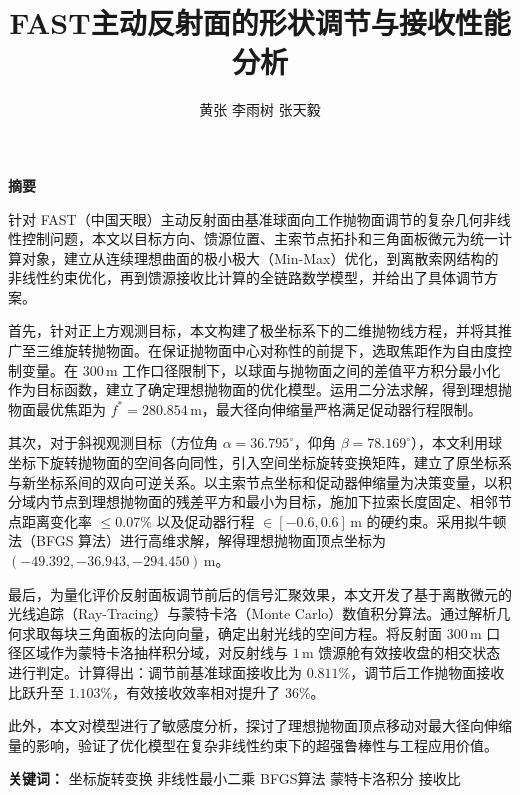 \documentclass[UTF8,a4paper,zihao=-4]{ctexart}
\title{\heiti FAST主动反射面的形状调节与接收性能分析}
\author{黄张 \quad 李雨树 \quad 张天毅}
\date{}
\begin{document}
\maketitle
\thispagestyle{empty}

\begin{center}
    {\bfseries 摘要}
\end{center}

针对 FAST（中国天眼）主动反射面由基准球面向工作抛物面调节的复杂几何非线性控制问题，本文以目标方向、馈源位置、主索节点拓扑和三角面板微元为统一计算对象，建立从连续理想曲面的极小极大（Min-Max）优化，到离散索网结构的非线性约束优化，再到馈源接收比计算的全链路数学模型，并给出了具体调节方案。

首先，针对正上方观测目标，本文构建了极坐标系下的二维抛物线方程，并将其推广至三维旋转抛物面。在保证抛物面中心对称性的前提下，选取焦距作为自由度控制变量。在 $300\,\mathrm{m}$ 工作口径限制下，以球面与抛物面之间的差值平方积分最小化作为目标函数，建立了确定理想抛物面的优化模型。运用二分法求解，得到理想抛物面最优焦距为 $f^*=280.854\,\mathrm{m}$，最大径向伸缩量严格满足促动器行程限制。

其次，对于斜视观测目标（方位角 $\alpha=36.795^\circ$，仰角 $\beta=78.169^\circ$），本文利用球坐标下旋转抛物面的空间各向同性，引入空间坐标旋转变换矩阵，建立了原坐标系与新坐标系间的双向可逆关系。以主索节点坐标和促动器伸缩量为决策变量，以积分域内节点到理想抛物面的残差平方和最小为目标，施加下拉索长度固定、相邻节点距离变化率 $\le 0.07\%$ 以及促动器行程 $\in [-0.6, 0.6]\,\mathrm{m}$ 的硬约束。采用拟牛顿法（BFGS 算法）进行高维求解，解得理想抛物面顶点坐标为 $(-49.392, -36.943, -294.450)\,\mathrm{m}$。

最后，为量化评价反射面板调节前后的信号汇聚效果，本文开发了基于离散微元的光线追踪（Ray-Tracing）与蒙特卡洛（Monte Carlo）数值积分算法。通过解析几何求取每块三角面板的法向向量，确定出射光线的空间方程。将反射面 $300\,\mathrm{m}$ 口径区域作为蒙特卡洛抽样积分域，对反射线与 $1\,\mathrm{m}$ 馈源舱有效接收盘的相交状态进行判定。计算得出：调节前基准球面接收比为 $0.811\%$，调节后工作抛物面接收比跃升至 $1.103\%$，有效接收效率相对提升了 $36\%$。

此外，本文对模型进行了敏感度分析，探讨了理想抛物面顶点移动对最大径向伸缩量的影响，验证了优化模型在复杂非线性约束下的超强鲁棒性与工程应用价值。

\vspace{1em}
\noindent\textbf{关键词：} 坐标旋转变换 \quad 非线性最小二乘 \quad BFGS算法 \quad 蒙特卡洛积分 \quad 接收比 
\end{document}
